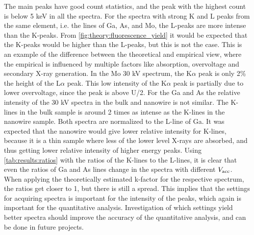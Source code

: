 The main peaks have good count statistics, and the peak with the highest count is below 5 keV in all the spectra.
For the spectra with strong K and L peaks from the same element, i.e. the lines of Ga, As, and Mo, the L-peaks are more intense than the K-peaks.
From \cref{fig:theory:fluorescence_yield} it would be expected that the K-peaks would be higher than the L-peaks, but this is not the case.
This is an example of the difference between the theoretical and empirical view, where the empirical is influenced by multiple factors like absorption, overvoltage and secondary X-ray generation.
In the Mo 30 kV spectrum, the K$\alpha$ peak is only 2\% the height of the L$\alpha$ peak.
This low intensity of the K$\alpha$ peak is partially due to lower overvoltage, since the peak is above U/2.
For the Ga and As the relative intensity of the 30 kV spectra in the bulk and nanowire is not similar.
The K-lines in the bulk sample is around 2 times as intense as the K-lines in the nanowire sample.
Both spectra are normalized to the L-line of Ga.
It was expected that the nanowire would give lower relative intensity for K-lines, because it is a thin sample where less of the lower level X-rays are absorbed, and thus getting lower relative intensity of higher energy peaks.
Using \cref{tab:results:ratios} with the ratios of the K-lines to the L-lines, it is clear that even the ratios of Ga and As lines change in the spectra with different $V_\textnormal{acc}$.
When applying the theoretically estimated k-factor for the respective spectrum, the ratios get closer to 1, but there is still a spread.
This implies that the settings for acquiring spectra is important for the intensity of the peaks, which again is important for the quantitative analysis.
Investigation of which settings yield better spectra should improve the accuracy of the quantitative analysis, and can be done in future projects.


